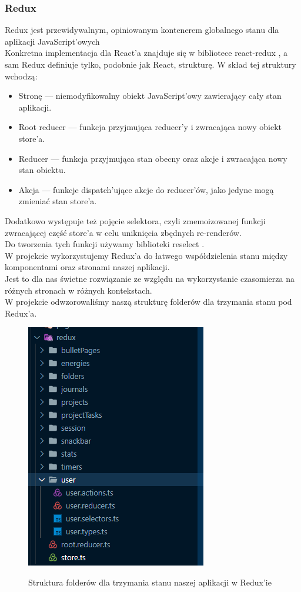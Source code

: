 \documentclass[a4paper,11pt]{report}
\begin{document}
\subsubsection{Redux}
\label{subsec:redux}
Redux\cite{redux} jest przewidywalnym, opiniowanym kontenerem globalnego stanu dla aplikacji JavaScript'owych\\
Konkretna implementacja dla React'a znajduje się w bibliotece react-redux \cite{react-redux},
 a sam Redux definiuje tylko, podobnie jak React, strukturę.
W skład tej struktury wchodzą:
\begin{itemize}
	\item Stronę — niemodyfikowalny obiekt JavaScript'owy zawierający cały stan aplikacji.
	\item Root reducer — funkcja przyjmująca reducer'y i zwracająca nowy obiekt store'a.
	\item Reducer — funkcja przyjmująca stan obecny oraz akcje i zwracająca nowy stan obiektu.
	\item Akcja — funkcje dispatch'ujące akcje do reducer'ów, jako jedyne mogą zmieniać stan store'a.
\end{itemize}
Dodatkowo występuje też pojęcie selektora, czyli zmemoizowanej funkcji zwracającej część store'a w celu uniknięcia zbędnych re-renderów.\\
Do tworzenia tych funkcji używamy biblioteki reselect \cite{reselect}.\\
W projekcie wykorzystujemy Redux'a do łatwego współdzielenia stanu między komponentami oraz stronami naszej aplikacji.\\
Jest to dla nas świetne rozwiązanie ze względu na wykorzystanie czasomierza na różnych stronach w różnych kontekstach.\\
W projekcie odwzorowaliśmy naszą strukturę folderów dla trzymania stanu pod Redux'a.
\begin{figure}[H]
	\centering
	\includegraphics[scale=0.5]{implementacja/frontend/struktura_redux}\\
	\caption{Struktura folderów dla trzymania stanu naszej aplikacji w Redux'ie}
	\label{fig:struktura_redux}
\end{figure}
\end{document}

